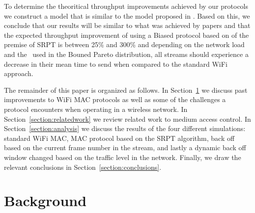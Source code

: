 \documentclass{sigcomm-alternate}
\begin{document}


To determine the theoritical throughput improvements achieved by our protocols we construct a model that is similar to the model proposed in \cite{Unfair, Harchol}. Based on this, we conclude that our results will be similar to what was achieved by papers \cite{Unfair, Harchol} and that the expected throughput improvement of using a Biased protocol based on of the premise of SRPT is between 25\% and 300\% and depending on the network load and the \textalpha \ used in the Bouned Pareto distribution, all streams should experience a decrease in their mean time to send when compared to the standard WiFi approach.

The remainder of this paper is organized as follows. In Section~\ref{section:background} we discuss past improvements to WiFi MAC protocols as well as some of the challenges a protocol encounters when operating in a wireless network. In Section~\ref{section:relatedwork} we review related work to medium access control. In Section~\ref{section:analysis} we discuss the results of the four different simulations: standard WiFi MAC, MAC protocol based on the SRPT algorithm, back off based on the current frame number in the stream, and lastly a dynamic back off window changed based on the traffic level in the network. Finally, we draw the relevant conclusions in Section~\ref{section:conclusions}.


%
%
%
%


\section{Background}
\label{section:background}

\end{document}
